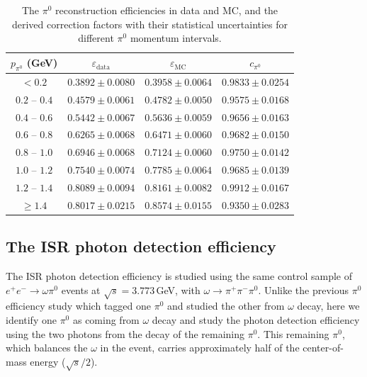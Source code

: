 \begin{table}[htbp]
    \begin{center}
        \caption{The $\pi^0$ reconstruction efficiencies in data and MC, and the derived correction factors with their statistical uncertainties for different $\pi^0$ momentum intervals.}
        \vspace{4mm}
        \renewcommand{\arraystretch}{1.3}
        \begin{tabular}{c | c | c | c}
            \hline \hline
            $p_{\pi^0}$ (GeV) & $\varepsilon_{\text{data}}$ & $\varepsilon_{\text{MC}}$ & $c_{\pi^0}$         \\
            \hline
            $< 0.2$           & $0.3892 \pm 0.0080$         & $0.3958 \pm 0.0064$       & $0.9833 \pm 0.0254$ \\
            \hline
            $0.2$ -- $0.4$    & $0.4579 \pm 0.0061$         & $0.4782 \pm 0.0050$       & $0.9575 \pm 0.0168$ \\
            \hline
            $0.4$ -- $0.6$    & $0.5442 \pm 0.0067$         & $0.5636 \pm 0.0059$       & $0.9656 \pm 0.0163$ \\
            \hline
            $0.6$ -- $0.8$    & $0.6265 \pm 0.0068$         & $0.6471 \pm 0.0060$       & $0.9682 \pm 0.0150$ \\
            \hline
            $0.8$ -- $1.0$    & $0.6946 \pm 0.0068$         & $0.7124 \pm 0.0060$       & $0.9750 \pm 0.0142$ \\
            \hline
            $1.0$ -- $1.2$    & $0.7540 \pm 0.0074$         & $0.7785 \pm 0.0064$       & $0.9685 \pm 0.0139$ \\
            \hline
            $1.2$ -- $1.4$    & $0.8089 \pm 0.0094$         & $0.8161 \pm 0.0082$       & $0.9912 \pm 0.0167$ \\
            \hline
            $\ge 1.4$         & $0.8017 \pm 0.0215$         & $0.8574 \pm 0.0155$       & $0.9350 \pm 0.0283$ \\
            \hline \hline
        \end{tabular}
        \label{tab:pi0_correction}
    \end{center}
\end{table}

\subsection{The ISR photon detection efficiency}

The ISR photon detection efficiency is studied using the same control sample of $e^+e^- \to \omega \pi^0$ events at $\sqrt{s} = 3.773$\,GeV, with $\omega \to \pi^+\pi^-\pi^0$. Unlike the previous $\pi^0$ efficiency study which tagged one $\pi^0$ and studied the other from $\omega$ decay, here we identify one $\pi^0$ as coming from $\omega$ decay and study the photon detection efficiency using the two photons from the decay of the remaining $\pi^0$. This remaining $\pi^0$, which balances the $\omega$ in the event, carries approximately half of the center-of-mass energy ($\sqrt{s}/2$).

